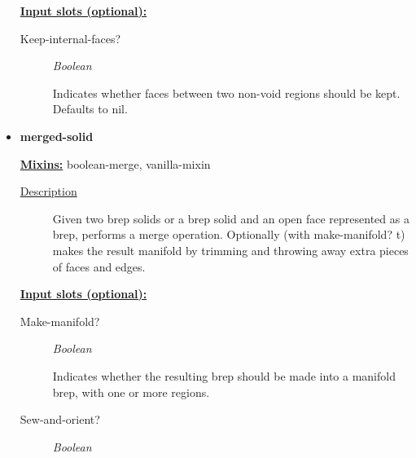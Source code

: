 \documentclass [11pt]{book}
\begin{document}
\begin{itemize}
\begin{description}
\end{description}






\textbf{
\underline{Input slots (optional):}}

\begin{description}

\item [Keep-internal-faces?]
\emph{Boolean}

 Indicates whether faces between two non-void regions should be kept.
Defaults to nil.




\end{description}







\item {}
\label{prim:merged-solid}
\textbf{merged-solid}


\textbf{
\underline{Mixins:}} boolean-merge, vanilla-mixin





\begin{description}

\item [
\underline{Description}]


Given two brep solids or a brep solid and an open face represented as a brep,
performs a merge operation. Optionally (with make-manifold? t) makes the result manifold by trimming 
and throwing away extra pieces of faces and edges.



\end{description}








\textbf{
\underline{Input slots (optional):}}

\begin{description}

\item [Make-manifold?]
\emph{Boolean}

 Indicates whether the resulting brep should be made into a manifold brep, with one or more regions.




\item [Sew-and-orient?]
\emph{Boolean}


\end{description}
\end{itemize}
\end{document}
